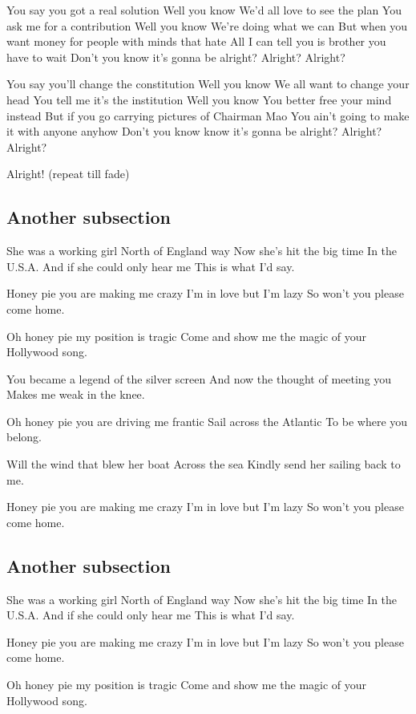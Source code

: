 You say you got a real solution
Well you know
We’d all love to see the plan
You ask me for a contribution
Well you know
We’re doing what we can
But when you want money for people with minds that hate
All I can tell you is brother you have to wait
Don’t you know it’s gonna be alright?
Alright?
Alright?

You say you’ll change the constitution
Well you know
We all want to change your head
You tell me it’s the institution
Well you know
You better free your mind instead
But if you go carrying pictures of Chairman Mao
You ain’t going to make it with anyone anyhow
Don’t you know know it’s gonna be alright?
Alright?
Alright?

Alright!
(repeat till fade)


\subsection*{Another subsection}

She was a working girl
North of England way
Now she's hit the big time
In the U.S.A.
And if she could only hear me
This is what I'd say.

Honey pie you are making me crazy 
I'm in love but I'm lazy
So won't you please come home.

Oh honey pie my position is tragic
Come and show me the magic
of your Hollywood song.

You became a legend of the silver screen
And now the thought of meeting you
Makes me weak in the knee.

Oh honey pie you are driving me frantic
Sail across the Atlantic
To be where you belong.

Will the wind that blew her boat 
Across the sea
Kindly send her sailing back to me.

Honey pie you are making me crazy
I'm in love but I'm lazy
So won't you please come home.

\subsection*{Another subsection}

She was a working girl
North of England way
Now she's hit the big time
In the U.S.A.
And if she could only hear me
This is what I'd say.

Honey pie you are making me crazy 
I'm in love but I'm lazy
So won't you please come home.

Oh honey pie my position is tragic
Come and show me the magic
of your Hollywood song.

